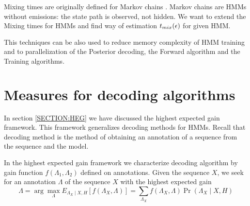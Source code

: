 Mixing times are originally defined for Markov chains \cite{Levin2006}. Markov
chains are HMMs without emissions: the state path is observed, not hidden. We
want to extend the Mixing times for HMMs and find way of estimation $t_{mix}(\epsilon)$ for
given HMM.

This techniques can be also used to reduce memory complexity of HMM training and
to parallelization of the Posterior decoding, the Forward algorithm and the
Training algorithms.

\section{Measures for decoding algorithms}


In section \ref{SECTION:HEG} we have discussed the highest expected gain
framework. This framework generalizes decoding methods for HMMs. Recall that
decoding method is the method of obtaining an annotation of a sequence from the
sequence and the model. 

In the highest expected gain framework we characterize decoding algorithm by
gain function $f(\Lambda_1,\Lambda_2)$ defined on annotations. Given the sequence
$X$, we seek 
for an annotation $\Lambda$ of the sequence $X$ with the highest expected gain
\[\Lambda = \arg\max_{\Lambda} 
E_{\Lambda_X\mid X,H}[f(\Lambda_X,\Lambda)] =
\sum_{\Lambda_X}f(\Lambda_X,\Lambda)\Pr\left(\Lambda_X\mid X,H\right)
\]

